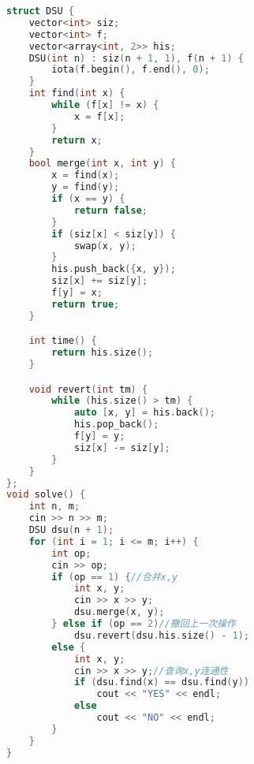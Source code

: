 \begin{lstlisting}[language=C++]
struct DSU {
    vector<int> siz;
    vector<int> f;
    vector<array<int, 2>> his;
    DSU(int n) : siz(n + 1, 1), f(n + 1) {
        iota(f.begin(), f.end(), 0);
    }
    int find(int x) {
        while (f[x] != x) {
            x = f[x];
        }
        return x;
    }
    bool merge(int x, int y) {
        x = find(x);
        y = find(y);
        if (x == y) {
            return false;
        }
        if (siz[x] < siz[y]) {
            swap(x, y);
        }
        his.push_back({x, y});
        siz[x] += siz[y];
        f[y] = x;
        return true;
    }

    int time() {
        return his.size();
    }

    void revert(int tm) {
        while (his.size() > tm) {
            auto [x, y] = his.back();
            his.pop_back();
            f[y] = y;
            siz[x] -= siz[y];
        }
    }
};
void solve() {
    int n, m;
    cin >> n >> m;
    DSU dsu(n + 1);
    for (int i = 1; i <= m; i++) {
        int op;
        cin >> op;
        if (op == 1) {//合并x,y
            int x, y;
            cin >> x >> y;
            dsu.merge(x, y);
        } else if (op == 2)//撤回上一次操作
            dsu.revert(dsu.his.size() - 1);
        else {
            int x, y;
            cin >> x >> y;//查询x,y连通性
            if (dsu.find(x) == dsu.find(y))
                cout << "YES" << endl;
            else
                cout << "NO" << endl;
        }
    }
}

\end{lstlisting}
